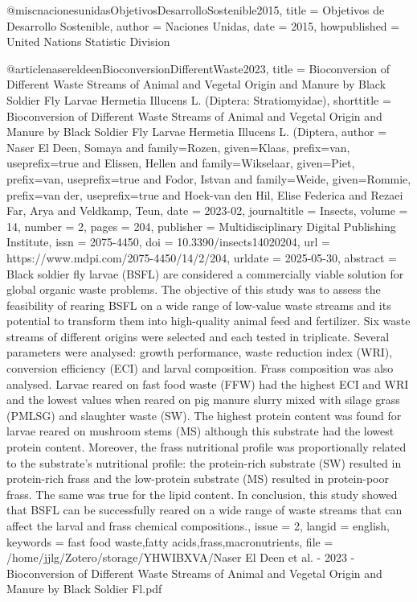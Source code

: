 {{{{@misc{nacionesunidasObjetivosDesarrolloSostenible2015,
  title = {Objetivos de Desarrollo Sostenible},
  author = {{Naciones Unidas}},
  date = {2015},
  howpublished = {United Nations Statistic Division}
}

@article{nasereldeenBioconversionDifferentWaste2023,
  title = {Bioconversion of {{Different Waste Streams}} of {{Animal}} and {{Vegetal Origin}} and {{Manure}} by {{Black Soldier Fly Larvae Hermetia}} Illucens {{L}}. ({{Diptera}}: {{Stratiomyidae}})},
  shorttitle = {Bioconversion of {{Different Waste Streams}} of {{Animal}} and {{Vegetal Origin}} and {{Manure}} by {{Black Soldier Fly Larvae Hermetia}} Illucens {{L}}. ({{Diptera}}},
  author = {Naser El Deen, Somaya and family=Rozen, given=Klaas, prefix=van, useprefix=true and Elissen, Hellen and family=Wikselaar, given=Piet, prefix=van, useprefix=true and Fodor, Istvan and family=Weide, given=Rommie, prefix=van der, useprefix=true and Hoek-van den Hil, Elise Federica and Rezaei Far, Arya and Veldkamp, Teun},
  date = {2023-02},
  journaltitle = {Insects},
  volume = {14},
  number = {2},
  pages = {204},
  publisher = {Multidisciplinary Digital Publishing Institute},
  issn = {2075-4450},
  doi = {10.3390/insects14020204},
  url = {https://www.mdpi.com/2075-4450/14/2/204},
  urldate = {2025-05-30},
  abstract = {Black soldier fly larvae (BSFL) are considered a commercially viable solution for global organic waste problems. The objective of this study was to assess the feasibility of rearing BSFL on a wide range of low-value waste streams and its potential to transform them into high-quality animal feed and fertilizer. Six waste streams of different origins were selected and each tested in triplicate. Several parameters were analysed: growth performance, waste reduction index (WRI), conversion efficiency (ECI) and larval composition. Frass composition was also analysed. Larvae reared on fast food waste (FFW) had the highest ECI and WRI and the lowest values when reared on pig manure slurry mixed with silage grass (PMLSG) and slaughter waste (SW). The highest protein content was found for larvae reared on mushroom stems (MS) although this substrate had the lowest protein content. Moreover, the frass nutritional profile was proportionally related to the substrate’s nutritional profile: the protein-rich substrate (SW) resulted in protein-rich frass and the low-protein substrate (MS) resulted in protein-poor frass. The same was true for the lipid content. In conclusion, this study showed that BSFL can be successfully reared on a wide range of waste streams that can affect the larval and frass chemical compositions.},
  issue = {2},
  langid = {english},
  keywords = {fast food waste,fatty acids,frass,macronutrients},
  file = {/home/jjlg/Zotero/storage/YHWIBXVA/Naser El Deen et al. - 2023 - Bioconversion of Different Waste Streams of Animal and Vegetal Origin and Manure by Black Soldier Fl.pdf}
}

}}}}
